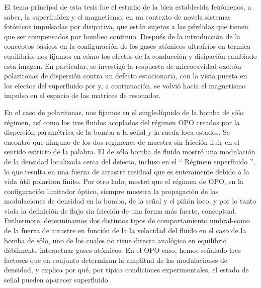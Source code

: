 
El tema principal de esta tesis fue el estudio de la bien establecida
fenómenos, a saber, la superfluidez y el magnetismo, en un contexto de
novela sistemas fotónicos impulsadas por disipativa, que están sujetos
a las pérdidas que tienen que ser compensados ​​por bombeo
continuo. Después de la introducción de la conceptos básicos en la
configuración de los gases atómicos ultrafríos en térmica equilibrio,
nos fijamos en cómo los efectos de la conducción y disipación cambiado
esta imagen. En particular, se investigó la respuesta de microcavidad
excitón-polaritonas de dispersión contra un defecto estacionaria, con
la vista puesta en los efectos del superfluido por y, a continuación,
se volvió hacia el magnetismo impulso en el espacio de las matrices de
resonador.

En el caso de polaritonas, nos fijamos en el single-líquido de la
bomba de sólo régimen, así como los tres fluidos acoplados del régimen
OPO creados por la dispersión paramétrica de la bomba a la señal y la
rueda loca estados. Se encontró que ninguno de los dos regímenes de
muestra sin fricción fluir en el sentido estricto de la palabra. El de
sólo bomba de fluido mostró una modulación de la densidad localizada
cerca del defecto, incluso en el `` Régimen superfluido '', lo que
resulta en una fuerza de arrastre residual que es enteramente debido a
la vida útil polariton finito. Por otro lado, mostró que el régimen de
OPO, en la configuración limitador óptico, siempre muestra la
propagación de las modulaciones de densidad en la bomba, de la señal y
el piñón loco, y por lo tanto viola la definición de flujo sin
fricción de una forma más fuerte, conceptual. Futhermore, determinamos
dos distintos tipos de comportamiento umbral-como de la fuerza de
arrastre en función de la la velocidad del fluido en el caso de la
bomba de sólo, uno de los cuales no tiene directa analógico en
equilibrio débilmente interactuar gases atómicos. En el OPO caso,
hemos señalado tres factores que en conjunto determinan la amplitud de
las modulaciones de densidad, y explica por qué, por típica
condiciones experimentales, el estado de señal pueden aparecer
superfluido.

